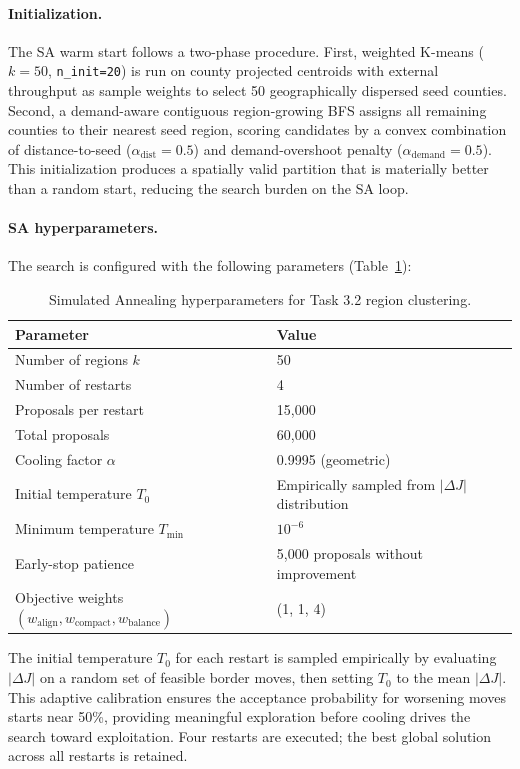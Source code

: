 \paragraph{Initialization.}
The SA warm start follows a two-phase procedure. First, weighted K-means ($k = 50$,
\texttt{n\_init=20}) is run on county projected centroids with external throughput as
sample weights to select 50 geographically dispersed seed counties. Second, a
demand-aware contiguous region-growing BFS assigns all remaining counties to their
nearest seed region, scoring candidates by a convex combination of distance-to-seed
($\alpha_{\text{dist}} = 0.5$) and demand-overshoot penalty
($\alpha_{\text{demand}} = 0.5$). This initialization produces a spatially valid
partition that is materially better than a random start, reducing the search burden on
the SA loop.

\paragraph{SA hyperparameters.}
The search is configured with the following parameters (Table~\ref{tab:task3-sa-params}):

\begin{table}[htbp]
\centering
\caption{Simulated Annealing hyperparameters for Task 3.2 region clustering.}
\begin{tabular}{ll}
\toprule
Parameter & Value \\
\midrule
Number of regions $k$ & 50 \\
Number of restarts & 4 \\
Proposals per restart & 15{,}000 \\
Total proposals & 60{,}000 \\
Cooling factor $\alpha$ & 0.9995 (geometric) \\
Initial temperature $T_0$ & Empirically sampled from $|\Delta J|$ distribution \\
Minimum temperature $T_{\min}$ & $10^{-6}$ \\
Early-stop patience & 5{,}000 proposals without improvement \\
Objective weights $(w_{\text{align}}, w_{\text{compact}}, w_{\text{balance}})$ & (1, 1, 4) \\
\bottomrule
\end{tabular}
\label{tab:task3-sa-params}
\end{table}

The initial temperature $T_0$ for each restart is sampled empirically by evaluating
$|\Delta J|$ on a random set of feasible border moves, then setting $T_0$ to the mean
$|\Delta J|$. This adaptive calibration ensures the acceptance probability for
worsening moves starts near 50\%, providing meaningful exploration before cooling
drives the search toward exploitation. Four restarts are executed; the best global
solution across all restarts is retained.

